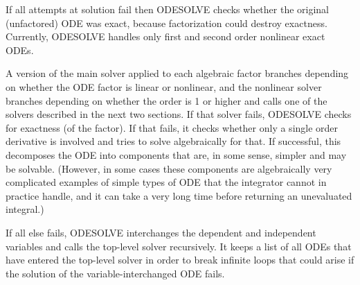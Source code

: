 If all attempts at solution fail then ODESOLVE checks whether the
original (unfactored) ODE was exact, because factorization could
destroy exactness.  Currently, ODESOLVE handles only first and
second order nonlinear exact ODEs.

A version of the main solver applied to each algebraic factor branches
depending on whether the ODE factor is linear or nonlinear, and the
nonlinear solver branches depending on whether the order is 1 or
higher and calls one of the solvers described in the next two
sections.  If that solver fails, ODESOLVE checks for exactness
(of the factor).  If that fails, it checks whether only a single order
derivative is involved and tries to solve algebraically for that.  If
successful, this decomposes the ODE into components that are, in some
sense, simpler and may be solvable.  (However, in some cases these
components are algebraically very complicated examples of simple types
of ODE that the integrator cannot in practice handle, and it can take
a very long time before returning an unevaluated integral.)

If all else fails, ODESOLVE interchanges the dependent and
independent variables and calls the top-level solver recursively.  It
keeps a list of all ODEs that have entered the top-level solver in
order to break infinite loops that could arise if the solution of the
variable-interchanged ODE fails.



